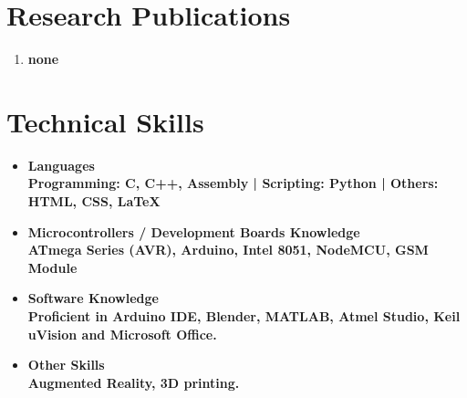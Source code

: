 \documentclass[11pt]{article}
\begin{document}
\begin{minipage}{18cm}
\begin{itemize}[leftmargin=*]
\end{itemize}

\section{Research Publications}
\begin{enumerate}[leftmargin=*]
\item \bfseries none\\
\end{enumerate}

\section{Technical Skills}
\begin{itemize}[leftmargin=*]
\item \bfseries Languages\\
Programming: \mdseries C, C++, Assembly | 
\bfseries Scripting: \mdseries Python | 
\bfseries Others: \mdseries HTML, CSS, \LaTeX\\

\item \bfseries Microcontrollers / Development Boards Knowledge\\
\mdseries ATmega Series (AVR), Arduino, Intel 8051, NodeMCU, GSM Module\\

\item \bfseries Software Knowledge\\
\mdseries Proficient in Arduino IDE, Blender, MATLAB, Atmel Studio, Keil uVision and Microsoft Office.\\

\item \bfseries Other Skills\\
\mdseries Augmented Reality, 3D printing.\\
\end{itemize}

\end{minipage}
\pagebreak
\end{document}
